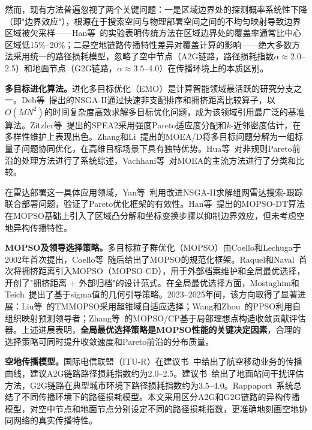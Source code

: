 然而，现有方法普遍忽视了两个关键问题：一是区域边界处的探测概率系统性下降（即"边界效应"），根源在于搜索空间与物理部署空间之间的不均匀映射导致边界区域被欠采样——Han等~\cite{Han2025}的实验表明传统方法在区域边界处的覆盖率通常比中心区域低15\%--20\%；二是空地链路传播特性差异对覆盖计算的影响——绝大多数方法采用统一的路径损耗模型，忽略了空中节点（A2G链路，路径损耗指数$\alpha \approx 2.0$--2.5）和地面节点（G2G链路，$\alpha \approx 3.5$--4.0）在传播环境上的本质区别。

\textbf{多目标进化算法。}进化多目标优化（EMO）是计算智能领域最活跃的研究分支之一。Deb等~\cite{Deb2002}提出的NSGA-II通过快速非支配排序和拥挤距离比较算子，以$O(M N^2)$的时间复杂度高效求解多目标优化问题，成为该领域引用最广泛的基准算法。Zitzler等~\cite{Zitzler2001}提出的SPEA2采用强度Pareto适应度分配和$k$-近邻密度估计，在多样性维护上表现出色。Zhang和Li~\cite{Zhang2007}提出的MOEA/D将多目标问题分解为一组标量子问题协同优化，在高维目标场景下具有独特优势。Hua等~\cite{Hua2021}对非规则Pareto前沿的处理方法进行了系统综述，Vachhani等~\cite{Vachhani2015}对MOEA的主流方法进行了分类和比较。

在雷达部署这一具体应用领域，Yan等~\cite{Yan2024}利用改进NSGA-II求解组网雷达搜索-跟踪联合部署问题，验证了Pareto优化框架的有效性。Han等~\cite{Han2025}提出的MOPSO-DT算法在MOPSO基础上引入了区域凸分解和坐标变换步骤以抑制边界效应，但未考虑空地异构传播特性。

\textbf{MOPSO及领导选择策略。}多目标粒子群优化（MOPSO）由Coello和Lechuga于2002年首次提出，Coello等~\cite{Coello2004}随后给出了MOPSO的规范化框架。Raquel和Naval~\cite{Raquel2005}首次将拥挤距离引入MOPSO（MOPSO-CD），用于外部档案维护和全局最优选择，开创了"拥挤距离 + 外部归档"的设计范式。在全局最优选择方面，Mostaghim和Teich~\cite{Mostaghim2003}提出了基于sigma值的几何引导策略。2023--2025年间，该方向取得了显著进展：Liu等~\cite{Liu2023}的TMMOPSO采用超锥域自适应选择；Wang和Zhou~\cite{Wang2024}的PPSO利用自组织映射预测领导者；Zhang等~\cite{Zhang2024}的MOPSO/CP基于局部理想点构造收敛贡献评估器。上述进展表明，\textbf{全局最优选择策略是MOPSO性能的关键决定因素}，合理的选择策略可同时提升收敛速度和Pareto前沿的分布质量。

\textbf{空地传播模型。}国际电信联盟（ITU-R）在建议书~\cite{ITUP528}中给出了航空移动业务的传播曲线，建议A2G链路路径损耗指数约为2.0--2.5。建议书~\cite{ITUP452}给出了地面站间干扰评估方法，G2G链路在典型城市环境下路径损耗指数约为3.5--4.0。Rappaport~\cite{Rappaport2002}系统总结了不同传播环境下的路径损耗模型。本文采用区分A2G和G2G链路的异构传播模型，对空中节点和地面节点分别设定不同的路径损耗指数，更准确地刻画空地协同网络的真实传播特性。

